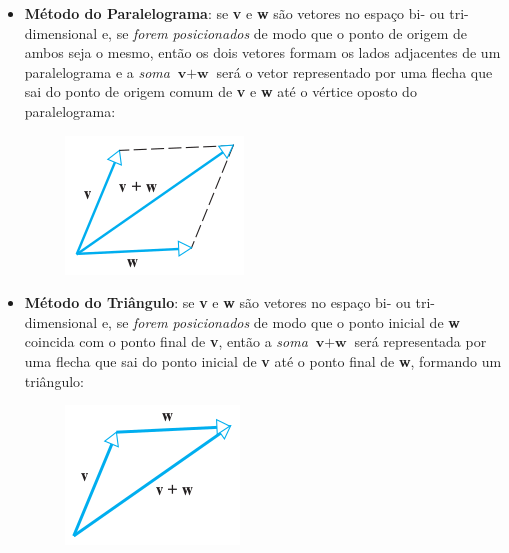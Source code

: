 \documentclass[pdftex, brazil, 12pt, twoside]{article}
\newcommand{\vet}[1]{\textbf{#1}}
\begin{document}
\begin{itemize}
\item \textbf{Método do Paralelograma}: se \vet{v} e \vet{w} são vetores no
  espaço bi- ou tri-dimensional e, se \emph{forem posicionados} de modo que o
  ponto de origem de ambos seja o mesmo, então os dois vetores formam os lados
  adjacentes de um paralelograma e a \emph{soma} $\vet{v} + \vet{w}$ será o vetor
  representado por uma flecha que sai do ponto de origem comum de \vet{v} e \vet{w}
  até o vértice oposto do paralelograma:
  \begin{figure}[H]
    \begin{center}
      \includegraphics[scale=0.6]{imagens/vet004.png}
    \end{center}
  \end{figure}
\item \textbf{Método do Triângulo}: se \vet{v} e \vet{w} são vetores no espaço bi-
  ou tri-dimensional e, se \emph{forem posicionados} de modo que o ponto inicial
  de \vet{w} coincida com o ponto final de \vet{v}, então a \emph{soma} $\vet{v}
  + \vet{w}$ será representada por uma flecha que sai do ponto inicial de \vet{v}
  até o ponto final de \vet{w}, formando um triângulo:
  \begin{figure}[H]
    \begin{center}
      \includegraphics[scale=0.6]{imagens/vet005.png}
    \end{center}
  \end{figure}
\end{itemize}
\end{document}
